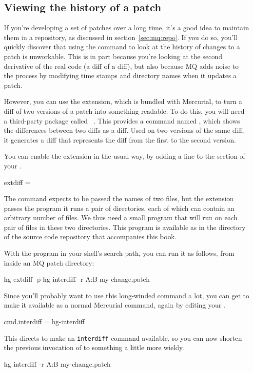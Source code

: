 \subsection{Viewing the history of a patch}
\label{mq-collab:tips:interdiff}

If you're developing a set of patches over a long time, it's a good
idea to maintain them in a repository, as discussed in
section~\ref{sec:mq:repo}.  If you do so, you'll quickly discover that
using the  command to look at the history of changes to a
patch is unworkable.  This is in part because you're looking at the
second derivative of the real code (a diff of a diff), but also
because MQ adds noise to the process by modifying time stamps and
directory names when it updates a patch.

However, you can use the  extension, which is bundled
with Mercurial, to turn a diff of two versions of a patch into
something readable.  To do this, you will need a third-party package
called ~\cite{web:patchutils}.  This provides a
command named , which shows the differences between
two diffs as a diff.  Used on two versions of the same diff, it
generates a diff that represents the diff from the first to the second
version.

You can enable the  extension in the usual way, by
adding a line to the  section of your \hgrc.
\begin{codesample2}
  [extensions]
  extdiff =
\end{codesample2}
The  command expects to be passed the names of two
files, but the  extension passes the program it runs a
pair of directories, each of which can contain an arbitrary number of
files.  We thus need a small program that will run 
on each pair of files in these two directories.  This program is
available as  in the 
directory of the source code repository that accompanies this book.

With the  program in your shell's search path,
you can run it as follows, from inside an MQ patch directory:
\begin{codesample2}
  hg extdiff -p hg-interdiff -r A:B my-change.patch
\end{codesample2}
Since you'll probably want to use this long-winded command a lot, you
can get  to make it available as a normal Mercurial
command, again by editing your \hgrc.
\begin{codesample2}
  [extdiff]
  cmd.interdiff = hg-interdiff
\end{codesample2}
This directs  to make an \texttt{interdiff} command
available, so you can now shorten the previous invocation of
 to something a little more wieldy.
\begin{codesample2}
  hg interdiff -r A:B my-change.patch
\end{codesample2}

